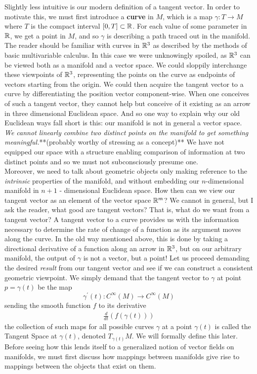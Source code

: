  Slightly less intuitive is our modern definition of a tangent vector.  In order to motivate this, we must first introduce a \textbf{curve} in $M$, which is a map $\gamma: T \to M$ where $T$ is the compact interval $[0, T] \subset \mathbb{R}$.  For each value of some parameter in $\mathbb{R}$, we get a point in $M$, and so $\gamma$ is describing a path traced out in the manifold.  The reader should be familiar with curves in $\mathbb{R}^3$ as described by the methods of basic multivariable calculus.  In this case we were unknowingly spoiled, as $\mathbb{R}^3$ can be viewed both as a manifold and a vector space.  We could sloppily interchange these viewpoints of $\mathbb{R}^3$, representing the points on the curve as endpoints of vectors starting from the origin.  We could then acquire the tangent vector to a curve by differentiating the position vector component-wise.  When  one conceives of such a tangent vector, they cannot help but conceive of it existing as an arrow in three dimensional Euclidean space. And so one way to explain why our old Euclidean ways fall short is this: our manifold is not in general a vector space.  \textit{We cannot linearly combine two distinct points on the manifold to get something meaningful.}**(probably worthy of stressing as a concept)**  We have not equipped our space with a structure enabling comparison of information at two distinct points and so we must not subconsciously presume one.\\
 
   Moreover, we need to talk about geometric objects only making reference to the \textit{intrinsic} properties of the manifold, and without embedding our $n$-dimensional manifold in $n+1$ - dimensional Euclidean space. How then can we view our tangent vector as an element of the vector space $\mathbb{R}^{m}$? We cannot in general, but I ask the reader, what good are tangent vectors?  That is, what do we want from a tangent vector?  A tangent vector to a curve provides us with the information necessary to determine the rate of change of a function as its argument moves along the curve.  In the old way mentioned above, this is done by taking a directional derivative of a function along an arrow in $\mathbb{R}^3$, but on our arbitrary manifold, the output of $\gamma$ is not a vector, but a point!  Let us proceed demanding the desired \textit{result} from our tangent vector and see if we can construct a consistent geometric viewpoint.  We simply demand that the tangent vector to $\gamma$ at point $p = \gamma(t)$ be the map 
   \begin{equation*}
   	\gamma^\prime(t): C^\infty(M) \to C^\infty(M)
   \end{equation*}
   sending the smooth function $f$ to its derivative 
\begin{align*}
	\frac{d}{dt}(f(\gamma(t)))
\end{align*}
the collection of such maps for all possible curves $\gamma$ at a point $\gamma(t)$ is called the Tangent Space at $\gamma(t)$, denoted $T_{\gamma(t)}M$.  We will formally define this later.  Before seeing how this lends itself to a generalized notion of vector fields on manifolds, we must first discuss how mappings between manifolds give rise to mappings between the objects that exist on them. 
